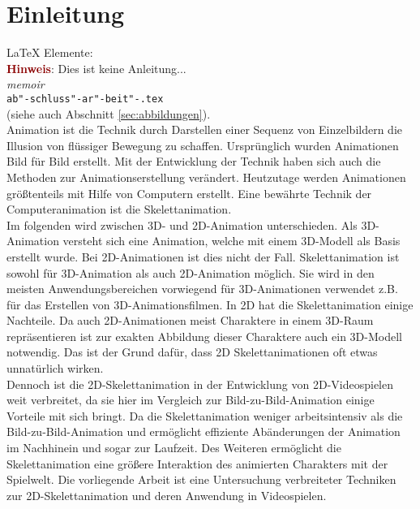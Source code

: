 %
%
%
%
\chapter{Einleitung}
\label{cha:introduction}
%
%
LaTeX Elemente: \\

\noindent \textbf{\textcolor{darkred}{Hinweis}}: Dies ist keine Anleitung... \\
\textit{memoir} \\
\texttt{ab"-schluss"-ar"-beit"-.tex} \\
(siehe auch Abschnitt \ref{sec:abbildungen}). \\

Animation ist die Technik durch Darstellen einer Sequenz von Einzelbildern die Illusion von flüssiger Bewegung zu schaffen. Ursprünglich wurden Animationen Bild für Bild erstellt. Mit der Entwicklung der Technik haben sich auch die Methoden zur Animationserstellung verändert. Heutzutage werden Animationen größtenteils mit Hilfe von Computern erstellt. Eine bewährte Technik der Computeranimation ist die Skelettanimation. \\

Im folgenden wird zwischen 3D- und 2D-Animation unterschieden. Als 3D-Animation versteht sich eine Animation, welche mit einem 3D-Modell als Basis erstellt wurde. Bei 2D-Animationen ist dies nicht der Fall. Skelettanimation ist sowohl für 3D-Animation als auch 2D-Animation möglich. Sie wird in den meisten Anwendungsbereichen vorwiegend für 3D-Animationen verwendet z.B. für das Erstellen von 3D-Animationsfilmen. In 2D hat die Skelettanimation einige Nachteile. Da auch 2D-Animationen meist Charaktere in einem 3D-Raum repräsentieren ist zur exakten Abbildung dieser Charaktere auch ein 3D-Modell notwendig. Das ist der Grund dafür, dass 2D Skelettanimationen oft etwas unnatürlich wirken. \\

Dennoch ist die 2D-Skelettanimation in der Entwicklung von 2D-Videospielen weit verbreitet, da sie hier im Vergleich zur Bild-zu-Bild-Animation einige Vorteile mit sich bringt. Da die Skelettanimation weniger arbeitsintensiv als die Bild-zu-Bild-Animation und ermöglicht effiziente Abänderungen der Animation im Nachhinein und sogar zur Laufzeit. Des Weiteren ermöglicht die Skelettanimation eine größere Interaktion des animierten Charakters mit der Spielwelt. Die vorliegende Arbeit ist eine Untersuchung verbreiteter Techniken zur 2D-Skelettanimation und deren Anwendung in Videospielen. \\
%
%
%
%
%
